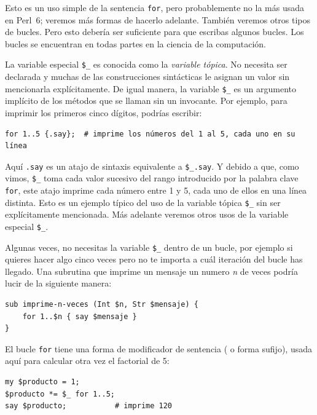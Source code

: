 Esto es un uso simple de la sentencia {\tt for},
pero probablemente no la más usada en Perl~6; veremos
más formas de hacerlo adelante. También veremos otros 
tipos de bucles. Pero esto debería ser suficiente para que 
escribas algunos bucles. Los bucles se encuentran en todas
partes en la ciencia de la computación.

La variable especial \verb|$_| es conocida como la 
\emph{variable tópica}. No necesita ser declarada y 
muchas de las construcciones sintácticas le asignan un valor
sin mencionarla explícitamente. De igual manera,
la variable \verb|$_| es un argumento implícito de los
métodos que se llaman sin un invocante. Por ejemplo,
para imprimir los primeros cinco dígitos, podrías
escribir:

\begin{lstlisting}
for 1..5 {.say};  # imprime los números del 1 al 5, cada uno en su línea
\end{lstlisting} 

Aquí {\tt .say} es un atajo de sintaxis equivalente a \verb|$_.say|.
Y debido a que, como vimos, \verb|$_| toma cada valor sucesivo del 
rango introducido por la palabra clave {\tt for}, este atajo imprime
cada número entre 1 y 5, cada uno de ellos en una línea distinta.
Esto es un ejemplo típico del uso de la variable tópica \verb|$_|
sin ser explícitamente mencionada. Más adelante veremos otros
usos de la variable especial \verb|$_|. 

Algunas veces, no necesitas la variable \verb|$_| dentro de un bucle,
por ejemplo si quieres hacer algo cinco veces pero no te importa a cuál
iteración del bucle has llegado. Una subrutina que imprime un mensaje 
un numero \emph{n} de veces podría lucir de la siguiente manera:

\begin{lstlisting}
sub imprime-n-veces (Int $n, Str $mensaje) {
    for 1..$n { say $mensaje }
} 
\end{lstlisting} 

El bucle {\tt for} tiene una forma de modificador de sentencia (
o forma sufijo), usada aquí para calcular otra vez el factorial de 5:

\begin{lstlisting}
my $producto = 1;
$producto *= $_ for 1..5;
say $producto;           # imprime 120
\end{lstlisting} 

